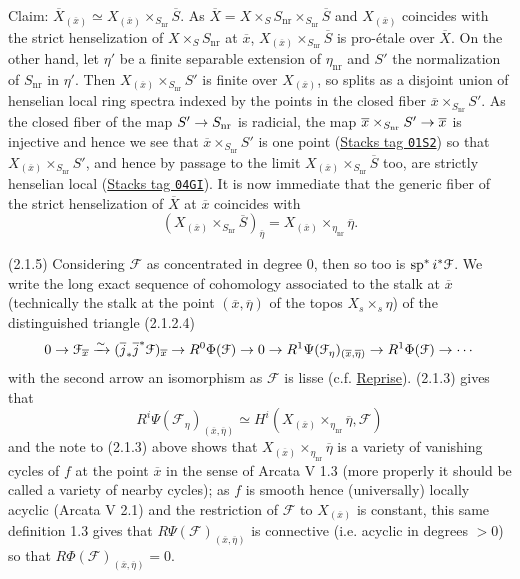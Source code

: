 \documentclass[deligne.tex]{subfiles}
\begin{document}
Claim: $\overline X_{(\overline x)}\simeq
X_{(\overline x)}\times_{S_{\mathrm{nr}}}\overline S$. As
$\overline X=X\times_SS_{\mathrm{nr}}\times_{S_{\mathrm{nr}}}\overline S$
and $X_{(\overline x)}$ coincides with the strict henselization of
$X\times_SS_{\mathrm{nr}}$ at $\overline x$,
$X_{(\overline x)}\times_{S_{\mathrm{nr}}}\overline S$ is pro-étale over
$\overline X$.
On the other hand, let $\eta'$ be a finite separable extension of
$\eta_{\mathrm{nr}}$ and $S'$ the normalization of $S_{\mathrm{nr}}$ in
$\eta'$. Then $X_{(\overline x)}\times_{S_{\mathrm{nr}}}S'$ is finite over
$X_{(\overline x)}$, so splits as a disjoint union of henselian local ring
spectra indexed by the points in the closed fiber
$\overline x\times_{S_{\mathrm{nr}}}S'$.
As the closed fiber of the map $S'\rightarrow S_{\mathrm{nr}}$ is radicial,
the map $\overline x\times_{S_{\mathrm{nr}}}S'\rightarrow\overline x$ is injective
and hence we see that $\overline x\times_{S_{\mathrm{nr}}}S'$ is one point
(\href{https://stacks.math.columbia.edu/tag/01S2}{Stacks tag \texttt{01S2}})
so that $X_{(\overline x)}\times_{S_{\mathrm{nr}}}S'$, and hence by passage 
to the limit $X_{(\overline x)}\times_{S_{\mathrm{nr}}}\overline S$ too,
are strictly henselian local
(\href{https://stacks.math.columbia.edu/tag/04GI}{Stacks tag \texttt{04GI}}).
It is now immediate that the generic fiber of the strict henselization of
$\overline X$ at $\overline x$ coincides with
\begin{equation*}
	(X_{(\overline x)}\times_{S_{\mathrm{nr}}}\overline S)_{\overline\eta}=
	X_{(\overline x)}\times_{\eta_{\mathrm{nr}}}\overline\eta.
\end{equation*}

(2.1.5) Considering $\mathcal F$ as concentrated in degree 0, then so too
is $\operatorname{sp}^*i^*\mathcal F$. We write the
long exact sequence of cohomology associated to the stalk at $\overline x$ 
(technically the stalk at the point $(\overline x,\overline\eta)$ of the
topos $X_s\times_s\eta$) of the distinguished triangle (2.1.2.4)
\begin{equation*}
	0\rightarrow\mathcal F_{\overline x}\xrightarrow\sim
	(\overline j_*\overline j^*\mathcal F)_{\overline x}\rightarrow
	R^0\Phi(\mathcal F)\rightarrow0\rightarrow
	R^1\Psi(\mathcal F_\eta)_{(\overline x,\overline\eta)}
	\rightarrow R^1\Phi(\mathcal F)\rightarrow\cdots
\end{equation*}
with the second arrow an isomorphism as $\mathcal F$ is lisse
(c.f. \hyperref[laumon:reprise]{Reprise}).
(2.1.3) gives that 
\begin{equation*}
	R^i\Psi(\mathcal F_\eta)_{(\overline x,\overline\eta)}\simeq
	H^i(X_{(\overline x)}\times_{\eta_{\mathrm{nr}}}\overline\eta,\mathcal F)
\end{equation*}
and the note to (2.1.3) above shows that
$X_{(\overline x)}\times_{\eta_{\mathrm{nr}}}\overline\eta$ is a variety of
vanishing cycles of $f$ at the point $\overline x$ in the sense of
Arcata V 1.3 (more properly it should be called a variety of nearby 
cycles); as $f$ is smooth hence (universally) locally acyclic
(Arcata V 2.1) and the restriction of $\mathcal F$ to $X_{(\overline x)}$
is constant, this same definition 1.3 gives that
$R\Psi(\mathcal F)_{(\overline x,\overline\eta)}$ is
connective (i.e. acyclic in degrees $>0$) so that
$R\Phi(\mathcal F)_{(\overline x,\overline\eta)}=0$.
\end{document}

